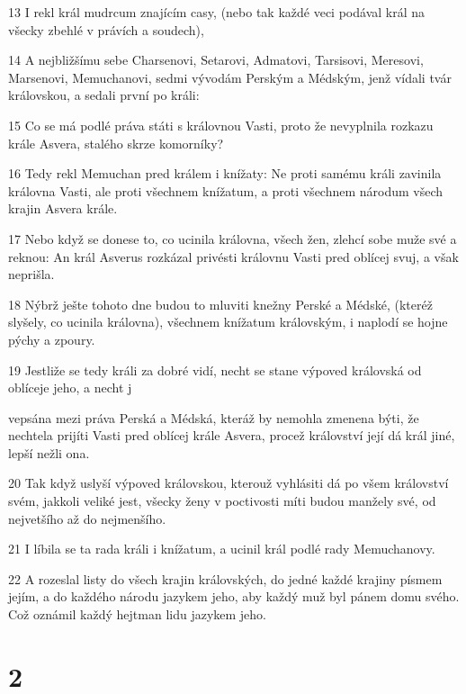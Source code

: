 \par 13 I rekl král mudrcum znajícím casy, (nebo tak každé veci podával král na všecky zbehlé v právích a soudech),
\par 14 A nejbližšímu sebe Charsenovi, Setarovi, Admatovi, Tarsisovi, Meresovi, Marsenovi, Memuchanovi, sedmi vývodám Perským a Médským, jenž vídali tvár královskou, a sedali první po králi:
\par 15 Co se má podlé práva státi s královnou Vasti, proto že nevyplnila rozkazu krále Asvera, stalého skrze komorníky?
\par 16 Tedy rekl Memuchan pred králem i knížaty: Ne proti samému králi zavinila královna Vasti, ale proti všechnem knížatum, a proti všechnem národum všech krajin Asvera krále.
\par 17 Nebo když se donese to, co ucinila královna, všech žen, zlehcí sobe muže své a reknou: An král Asverus rozkázal privésti královnu Vasti pred oblícej svuj, a však neprišla.
\par 18 Nýbrž ješte tohoto dne budou to mluviti knežny Perské a Médské, (kteréž slyšely, co ucinila královna), všechnem knížatum královským, i naplodí se hojne pýchy a zpoury.
\par 19 Jestliže se tedy králi za dobré vidí, necht se stane výpoved královská od oblíceje jeho, a necht j\par vepsána mezi práva Perská a Médská, kteráž by nemohla zmenena býti, že nechtela prijíti Vasti pred oblícej krále Asvera, procež království její dá král jiné, lepší nežli ona.
\par 20 Tak když uslyší výpoved královskou, kterouž vyhlásiti dá po všem království svém, jakkoli veliké jest, všecky ženy v poctivosti míti budou manžely své, od nejvetšího až do nejmenšího.
\par 21 I líbila se ta rada králi i knížatum, a ucinil král podlé rady Memuchanovy.
\par 22 A rozeslal listy do všech krajin královských, do jedné každé krajiny písmem jejím, a do každého národu jazykem jeho, aby každý muž byl pánem domu svého. Což oznámil každý hejtman lidu jazykem jeho.

\chapter{2}

